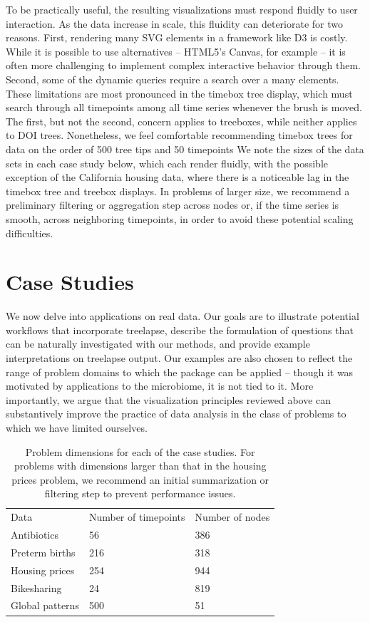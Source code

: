 \documentclass[12pt]{article}
\begin{document}
To be practically useful, the resulting visualizations must respond fluidly to
user interaction. As the data increase in scale, this fluidity can deteriorate
for two reasons. First, rendering many SVG elements in a framework like D3 is
costly\citep{johnson2008scalability}. While it is possible to use alternatives
-- HTML5's Canvas, for example -- it is often more challenging to implement
complex interactive behavior through them. Second, some of the dynamic queries
require a search over a many elements. These limitations are most pronounced in
the timebox tree display, which must search through all timepoints among all
time series whenever the brush is moved. The first, but not the second, concern
applies to treeboxes, while neither applies to DOI trees. Nonetheless, we feel
comfortable recommending timebox trees for data on the order of 500 tree tips
and 50 timepoints We note the sizes of the data sets in each case study below,
which each render fluidly, with the possible exception of the California housing
data, where there is a noticeable lag in the timebox tree and treebox displays.
In problems of larger size, we recommend a preliminary filtering or aggregation
step across nodes or, if the time series is smooth, across neighboring
timepoints, in order to avoid these potential scaling difficulties.

\section{Case Studies}\label{case-studies}

We now delve into applications on real data. Our goals are to illustrate
potential workflows that incorporate treelapse, describe the formulation of
questions that can be naturally investigated with our methods, and provide
example interpretations on treelapse output. Our examples are also chosen to
reflect the range of problem domains to which the package can be applied --
though it was motivated by applications to the microbiome, it is not tied to it.
More importantly, we argue that the visualization principles reviewed above can
substantively improve the practice of data analysis in the class of problems to
which we have limited ourselves.

\begin{table}
\centering
\begin{tabular}{lll}
Data            & Number of timepoints & Number of nodes \\
Antibiotics     & 56                 & 386             \\
Preterm births  & 216                & 318             \\
Housing prices  & 254                & 944             \\
Bikesharing     & 24                 & 819             \\
Global patterns & 500                & 51             
\end{tabular}
\caption{Problem dimensions for each of the case studies. For problems with
  dimensions larger than that in the housing prices problem, we recommend an
  initial summarization or filtering step to prevent performance
  issues. \label{problem-scaling}}
\end{table}
\end{document}
